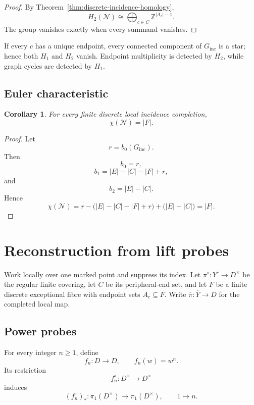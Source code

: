 \documentclass[11pt]{article}
\theoremstyle{plain}
\newtheorem{corollary}[theorem]{Corollary}
\theoremstyle{definition}
\begin{document}
\begin{proof}
By Theorem~\ref{thm:discrete-incidence-homology},
\[
H_2(\mathcal N)
\cong
\bigoplus_{c\in C}
\mathbb Z^{|A_c|-1}.
\]
The group vanishes exactly when every summand vanishes.
\end{proof}

If every $c$ has a unique endpoint, every connected component of $G_{\mathrm{inc}}$ is a star; hence both $H_1$ and $H_2$ vanish.  Endpoint multiplicity is detected by $H_2$, while graph cycles are detected by $H_1$.

\subsection{Euler characteristic}
\label{subsec:incidence-euler}


\begin{corollary}
\label{cor:incidence-euler}
For every finite discrete local incidence completion,
\[
\chi(\mathcal N)=|F|.
\]
\end{corollary}

\begin{proof}
Let
\[
r=b_0(G_{\mathrm{inc}}).
\]
Then
\[
b_0=r,
\]
\[
b_1=|E|-|C|-|F|+r,
\]
and
\[
b_2=|E|-|C|.
\]
Hence
\[
\chi(\mathcal N)
=
r-
\bigl(|E|-|C|-|F|+r\bigr)
+
\bigl(|E|-|C|\bigr)
=
|F|.
\]
\end{proof}



\section{Reconstruction from lift probes}
\label{sec:lift-reconstruction}

Work locally over one marked point and suppress its index.  Let
$\pi^\circ:Y^\circ\to D^\times$ be the regular finite covering, let $C$ be its
peripheral-end set, and let $F$ be a finite discrete exceptional fibre with endpoint
sets $A_c\subseteq F$.  Write $\overline\pi:\overline Y\to D$ for the completed local
map.

\subsection{Power probes}
\label{subsec:power-probes}

For every integer $n\geq1$, define
\[
f_n:D\longrightarrow D,
\qquad
f_n(w)=w^n.
\]
Its restriction
\[
f_n^\circ:D^\times\longrightarrow D^\times
\]
induces
\[
(f_n^\circ)_*:
\pi_1(D^\times)
\longrightarrow
\pi_1(D^\times),
\qquad
1\longmapsto n.
\]
\end{document}
